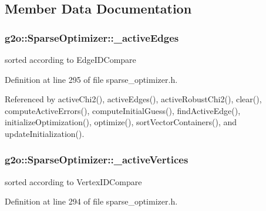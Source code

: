 \subsection{Member Data Documentation}
\subsubsection[{\texorpdfstring{\+\_\+active\+Edges}{_activeEdges}}]{ g2o\+::\+Sparse\+Optimizer\+::\+\_\+active\+Edges\hspace{0.3cm}{\ttfamily [protected]}}\hypertarget{classg2o_1_1SparseOptimizer_a3207df163943bc1672fc7872964a6d6c}{}\label{classg2o_1_1SparseOptimizer_a3207df163943bc1672fc7872964a6d6c}


sorted according to Edge\+I\+D\+Compare 



Definition at line 295 of file sparse\+\_\+optimizer.\+h.



Referenced by active\+Chi2(), active\+Edges(), active\+Robust\+Chi2(), clear(), compute\+Active\+Errors(), compute\+Initial\+Guess(), find\+Active\+Edge(), initialize\+Optimization(), optimize(), sort\+Vector\+Containers(), and update\+Initialization().

\subsubsection[{\texorpdfstring{\+\_\+active\+Vertices}{_activeVertices}}]{ g2o\+::\+Sparse\+Optimizer\+::\+\_\+active\+Vertices\hspace{0.3cm}{\ttfamily [protected]}}\hypertarget{classg2o_1_1SparseOptimizer_a805e1db97802980fa4dfef95cfa5e63e}{}\label{classg2o_1_1SparseOptimizer_a805e1db97802980fa4dfef95cfa5e63e}


sorted according to Vertex\+I\+D\+Compare 



Definition at line 294 of file sparse\+\_\+optimizer.\+h.



